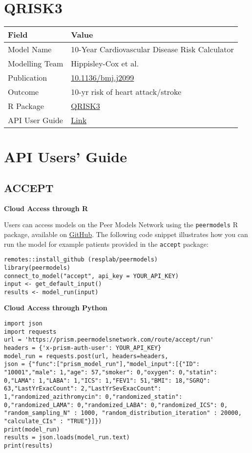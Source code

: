 \documentclass[
]{book}
\begin{document}
\hypertarget{qrisk3}{%
\chapter{QRISK3}\label{qrisk3}}

\begin{longtable}[]{@{}ll@{}}
\toprule
Field & Value\tabularnewline
\midrule
\endhead
Model Name & 10-Year Cardiovascular Disease Risk Calculator\tabularnewline
Modelling Team & Hippisley-Cox et al.\tabularnewline
Publication & \href{https://doi.org/10.1136/bmj.j2099}{10.1136/bmj.j2099}\tabularnewline
Outcome & 10-yr risk of heart attack/stroke\tabularnewline
R Package & \href{https://cran.r-project.org/package=QRISK3}{QRISK3}\tabularnewline
API User Guide & \href{https://resplab.github.io/prismguide/api-users-guide.html\#qrisk3-1}{Link}\tabularnewline
\bottomrule
\end{longtable}

\hypertarget{api-users-guide}{%
\chapter{API Users' Guide}\label{api-users-guide}}

\hypertarget{accept-1}{%
\section{ACCEPT}\label{accept-1}}

\textbf{Cloud Access through R}

Users can access models on the Peer Models Network using the \texttt{peermodels} R package, available on \href{https://github.com/resplab/peermodels}{GitHub}. The following code snippet illustrates how you can run the model for example patients provided in the \texttt{accept} package:

\begin{verbatim}
remotes::install_github (resplab/peermodels)
library(peermodels)
connect_to_model("accept", api_key = YOUR_API_KEY)
input <- get_default_input()
results <- model_run(input)
\end{verbatim}

\textbf{Cloud Access through Python}

\begin{verbatim}
import json
import requests
url = 'https://prism.peermodelsnetwork.com/route/accept/run'
headers = {'x-prism-auth-user': YOUR_API_KEY}
model_run = requests.post(url, headers=headers,
json = {"func":["prism_model_run"],"model_input":[{"ID": "10001","male": 1,"age": 57,"smoker": 0,"oxygen": 0,"statin": 0,"LAMA": 1,"LABA": 1,"ICS": 1,"FEV1": 51,"BMI": 18,"SGRQ": 63,"LastYrExacCount": 2,"LastYrSevExacCount": 1,"randomized_azithromycin": 0,"randomized_statin": 0,"randomized_LAMA": 0,"randomized_LABA": 0,"randomized_ICS": 0, "random_sampling_N" : 1000, "random_distribution_iteration" : 20000, "calculate_CIs" : "TRUE"}]})
print(model_run)
results = json.loads(model_run.text)
print(results)
\end{verbatim}
\end{document}
